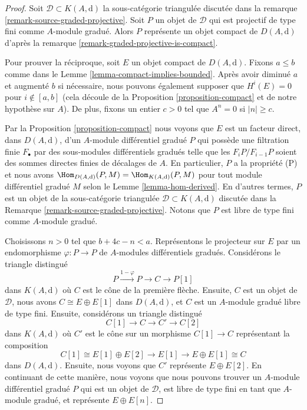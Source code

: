 \begin{proof}
Soit $\mathcal{D} \subset K(A, \text{d})$ la sous-catégorie triangulée discutée
dans la remarque \ref{remark-source-graded-projective}. Soit $P$ un objet de
$\mathcal{D}$ qui est projectif de type fini comme $A$-module gradué. Alors $P$ représente
un objet compact de $D(A, \text{d})$ d'après la remarque
\ref{remark-graded-projective-is-compact}.

\medskip\noindent
Pour prouver la réciproque, soit $E$ un objet compact de $D(A, \text{d})$. Fixons
$a \leq b$ comme dans le Lemme \ref{lemma-compact-implies-bounded}. Après avoir
diminué $a$ et augmenté $b$ si nécessaire, nous pouvons également supposer que
$H^i(E) = 0$ pour $i \not \in [a, b]$ (cela découle de la Proposition
\ref{proposition-compact} et de notre hypothèse sur $A$). De plus, fixons un
entier $c > 0$ tel que $A^n = 0$ si $|n| \geq c$.

\medskip\noindent
Par la Proposition \ref{proposition-compact} nous voyons que $E$ est un facteur
direct, dans $D(A, \text{d})$, d'un $A$-module différentiel gradué $P$ qui possède
une filtration finie $F_\bullet$ par des sous-modules différentiels gradués telle
que les $F_iP/F_{i - 1}P$ soient des sommes directes finies de décalages de $A$. En
particulier, $P$ a la propriété (P) et nous avons $\Hom_{D(A, \text{d})}(P, M) =
\Hom_{K(A, \text{d})}(P, M)$ pour tout module différentiel gradué $M$ selon le
Lemme \ref{lemma-hom-derived}. En d'autres termes, $P$ est un objet de la
sous-catégorie triangulée $\mathcal{D} \subset K(A, \text{d})$ discutée dans la
Remarque \ref{remark-source-graded-projective}. Notons que $P$ est libre de type
fini comme $A$-module gradué.

\medskip\noindent
Choisissons $n > 0$ tel que $b + 4c - n < a$. Représentons le projecteur sur $E$ par
un endomorphisme $\varphi : P \to P$ de $A$-modules différentiels gradués.
Considérons le triangle distingué
$$
P \xrightarrow{1 - \varphi} P \to C \to P[1]
$$
dans $K(A, \text{d})$ où $C$ est le cône de la première flèche. Ensuite, $C$ est
un objet de $\mathcal{D}$, nous avons $C \cong E \oplus E[1]$ dans $D(A,
\text{d})$, et $C$ est un $A$-module gradué libre de type fini. Ensuite, considérons un
triangle distingué
$$
C[1] \to C \to C' \to C[2]
$$
dans $K(A, \text{d})$ où $C'$ est le cône sur un morphisme $C[1] \to C$
représentant la composition
$$
C[1] \cong E[1] \oplus E[2] \to E[1] \to E \oplus E[1] \cong C
$$
dans $D(A, \text{d})$. Ensuite, nous voyons que $C'$ représente $E \oplus E[2]$.
En continuant de cette manière, nous voyons que nous pouvons trouver un $A$-module
différentiel gradué $P$ qui est un objet de $\mathcal{D}$, est libre de type
fini en tant que $A$-module gradué, et représente $E \oplus E[n]$.


\end{proof}
